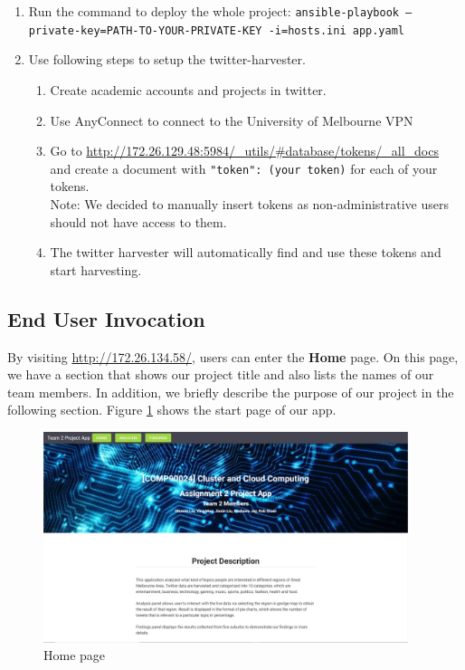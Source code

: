 \documentclass[parskip=full, 11pt]{article}
\begin{document}
\begin{enumerate}
    \item Run the command to deploy the whole project: \texttt{ansible-playbook --private-key=PATH-TO-YOUR-PRIVATE-KEY -i=hosts.ini app.yaml}
    
    \item Use following steps to setup the twitter-harvester.
    \begin{enumerate}
        \item Create academic accounts and projects in twitter.
        \item Use AnyConnect to connect to the University of Melbourne VPN
        \item Go to \url{http://172.26.129.48:5984/_utils/#database/tokens/_all_docs} and create a document with \texttt{{"token": (your token)}} for each of your tokens. \\
        Note: We decided to manually insert tokens as non-administrative users should not have access to them.
        \item The twitter harvester will automatically find and use these tokens and start harvesting.
    \end{enumerate}
\end{enumerate}

\subsection{End User Invocation}
By visiting \url{http://172.26.134.58/}, users can enter the \textbf{Home} page. On this page, we have a section that shows our project title and also lists the names of our team members. In addition, we briefly describe the purpose of our project in the following section. Figure \ref{fig:HomePage} shows the start page of our app.

\begin{figure}[hp]
    \centering
    \includegraphics[width=0.95\textwidth]{Figures/HomePage.JPG}
    \caption{Home page}
    \label{fig:HomePage}
\end{figure}
\end{document}
